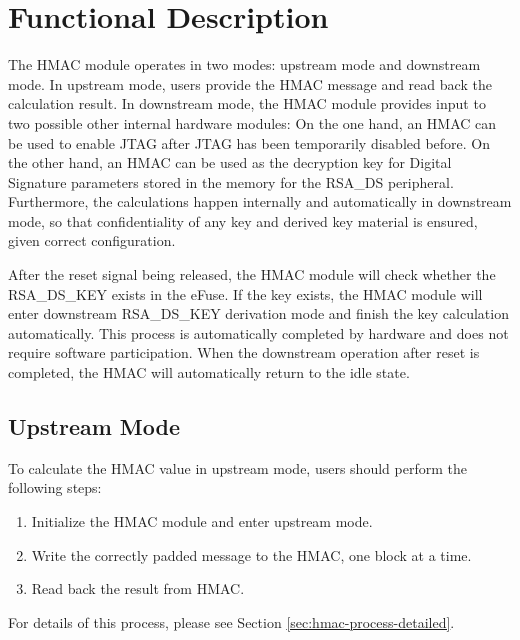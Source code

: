 \documentclass[main\_\_EN.tex]{subfiles}
\begin{document}
\section{Functional Description}

The HMAC module operates in two modes: upstream mode and downstream mode. In upstream mode, users provide the HMAC message and read back the calculation result. In downstream mode, the HMAC module provides input to two possible other internal hardware modules: On the one hand, an HMAC can be used to enable JTAG after JTAG has been temporarily disabled before. On the other hand, an HMAC can be used as the decryption key for Digital Signature parameters stored in the memory for the RSA\_DS peripheral. Furthermore, the calculations happen internally and automatically in downstream mode, so that confidentiality of any key and derived key material is ensured, given correct configuration.

\begin{tiplisting}
After the reset signal being released, the HMAC module will check whether the RSA\_DS\_KEY exists in the eFuse. If the key exists, the HMAC module will enter downstream RSA\_DS\_KEY derivation mode and finish the key calculation automatically. This process is automatically completed by hardware and does not require software participation. When the downstream operation after reset is completed, the HMAC will automatically return to the idle state.
\end{tiplisting}

\subsection{Upstream Mode}

To calculate the HMAC value in upstream mode, users should perform the following steps:

\begin{enumerate}
    \item Initialize the HMAC module and enter upstream mode.
    \item Write the correctly padded message to the HMAC, one block at a time.
    \item Read back the result from HMAC.
\end{enumerate}

For details of this process, please see Section \ref{sec:hmac-process-detailed}.
\end{document}
